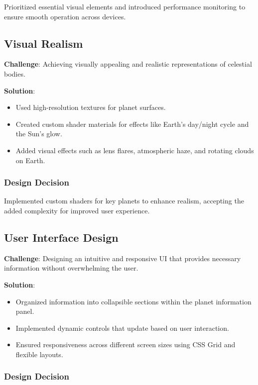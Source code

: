 \documentclass[12pt, a4paper]{article}
\begin{document}
Prioritized essential visual elements and introduced performance monitoring to
ensure smooth operation across devices.

\subsection{Visual Realism}

\textbf{Challenge}: Achieving visually appealing and realistic representations of celestial bodies.

\textbf{Solution}:

\begin{itemize}
    \item Used high-resolution textures for planet surfaces.
    \item Created custom shader materials for effects like Earth's day/night cycle and
          the Sun's glow.
    \item Added visual effects such as lens flares, atmospheric haze, and rotating clouds
          on Earth.
\end{itemize}

\subsubsection{Design Decision}

Implemented custom shaders for key planets to enhance realism, accepting the
added complexity for improved user experience.

\subsection{User Interface Design}

\textbf{Challenge}: Designing an intuitive and responsive UI that provides necessary information without overwhelming the user.

\textbf{Solution}:

\begin{itemize}
    \item Organized information into collapsible sections within the planet information
          panel.
    \item Implemented dynamic controls that update based on user interaction.
    \item Ensured responsiveness across different screen sizes using CSS Grid and
          flexible layouts.
\end{itemize}

\subsubsection{Design Decision}
\end{document}
